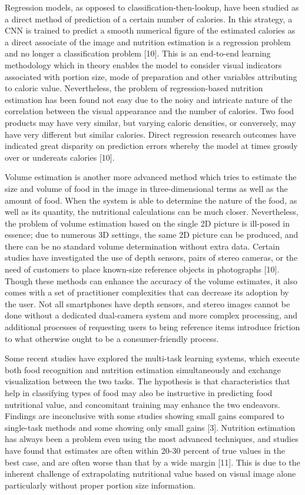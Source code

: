 \documentclass[12pt, openany]{report}
\begin{document}
Regression models, as opposed to classification-then-lookup, have been studied as a direct method of prediction of a certain number of calories. In this strategy, a CNN is trained to predict a smooth numerical figure of the estimated calories as a direct associate of the image and nutrition estimation is a regression problem and no longer a classification problem [10]. This is an end-to-end learning methodology which in theory enables the model to consider visual indicators associated with portion size, mode of preparation and other variables attributing to caloric value. Nevertheless, the problem of regression-based nutrition estimation has been found not easy due to the noisy and intricate nature of the correlation between the visual appearance and the number of calories. Two food products may have very similar, but varying caloric densities, or conversely, may have very different but similar calories. Direct regression research outcomes have indicated great disparity on prediction errors whereby the model at times grossly over or undereats calories [10].

Volume estimation is another more advanced method which tries to estimate the size and volume of food in the image in three-dimensional terms as well as the amount of food. When the system is able to determine the nature of the food, as well as its quantity, the nutritional calculations can be much closer. Nevertheless, the problem of volume estimation based on the single 2D picture is ill-posed in essence; due to numerous 3D settings, the same 2D picture can be produced, and there can be no standard volume determination without extra data. Certain studies have investigated the use of depth sensors, pairs of stereo cameras, or the need of customers to place known-size reference objects in photographs [10]. Though these methods can enhance the accuracy of the volume estimates, it also comes with a set of practitioner complexities that can decrease its adoption by the user. Not all smartphones have depth sensors, and stereo images cannot be done without a dedicated dual-camera system and more complex processing, and additional processes of requesting users to bring reference items introduce friction to what otherwise ought to be a consumer-friendly process.

Some recent studies have explored the multi-task learning systems, which execute both food recognition and nutrition estimation simultaneously and exchange visualization between the two tasks. The hypothesis is that characteristics that help in classifying types of food may also be instructive in predicting food nutritional value, and concomitant training may enhance the two endeavors. Findings are inconclusive with some studies showing small gains compared to single-task methods and some showing only small gains [3]. Nutrition estimation has always been a problem even using the most advanced techniques, and studies have found that estimates are often within 20-30 percent of true values in the best case, and are often worse than that by a wide margin [11]. This is due to the inherent challenge of extrapolating nutritional value based on visual image alone particularly without proper portion size information.
\end{document}
